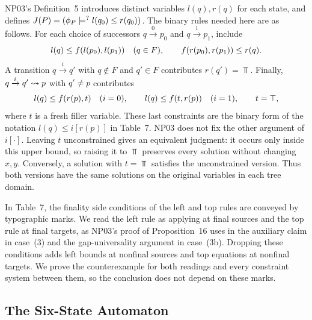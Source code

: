 NP03's Definition~5 introduces distinct variables $l(q),r(q)$ for each state,
and defines $J(P)=(\phi_P \models^{?} l(q_0) \le r(q_0))$.
The binary rules needed here are as follows. For each choice of successors
$q\xrightarrow{0}p_0$ and $q\xrightarrow{1}p_1$, include
\[
 l(q)\le f(l(p_0),l(p_1))\quad(q\in F),
 \qquad
 f(r(p_0),r(p_1))\le r(q).
\]
A transition $q\xrightarrow{i}q'$ with $q\notin F$ and $q'\in F$
contributes $r(q')=\Top$. Finally,
$q\xrightarrow{i}q'\rightsquigarrow p$ with $q'\ne p$ contributes
\[
 l(q)\le f(r(p),t)\quad(i=0),\qquad
 l(q)\le f(t,r(p))\quad(i=1),\qquad t=\top,
\]
where $t$ is a fresh filler variable. These last constraints are the
binary form of the notation $l(q)\le i[r(p)]$ in Table~7.
NP03 does not fix the other argument of $i[\cdot]$. Leaving $t$
unconstrained gives an equivalent judgment: it occurs only inside this
upper bound, so raising it to $\Top$ preserves every solution without
changing $x,y$. Conversely, a solution with $t=\Top$ satisfies the
unconstrained version. Thus both versions have the same solutions on
the original variables in each tree domain.

In Table~7, the finality side conditions of the left and top rules are
conveyed by typographic marks. We read the left rule as applying at final
sources and the top rule at final targets, as NP03's proof of
Proposition~16 uses in the auxiliary claim in case~(3) and the
gap-universality argument in case~(3b). Dropping these conditions adds
left bounds at nonfinal sources and top equations at nonfinal targets.
We prove the counterexample for both readings and every
constraint system between them, so the conclusion does not depend on
these marks.

\subsection{The Six-State Automaton}

